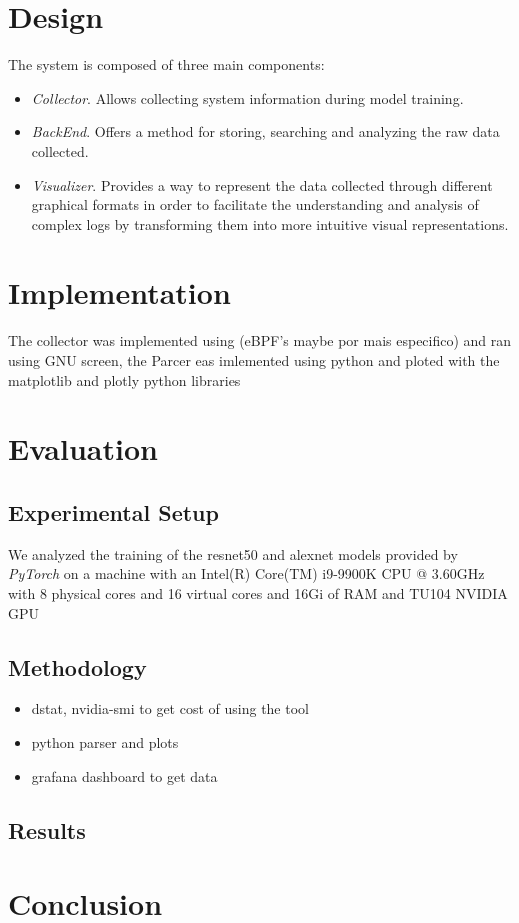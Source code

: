 \documentclass[conference]{IEEEtran}
\begin{document}
\section{Design}
    The system is composed of three main components:
    \begin{itemize}
        \item \textit{Collector}. Allows collecting system information during model training.
        \item \textit{BackEnd}. Offers a method for storing, searching and analyzing the raw data collected.
        \item \textit{Visualizer}. Provides a way to represent the data collected through different graphical formats in order to facilitate the understanding and analysis of complex logs by transforming them into more intuitive visual representations.
    \end{itemize}

\section{Implementation}
    The collector was implemented using (eBPF's maybe por mais especifico) and ran using GNU screen, the Parcer eas imlemented using python and ploted with the matplotlib and plotly python libraries 

\section{Evaluation}
\subsection{Experimental Setup}

We analyzed the training of the resnet50 \cite{resnet50} and alexnet \cite{alexnet} models
provided by \textit{PyTorch} on a machine with an Intel(R) Core(TM) i9-9900K CPU @ 3.60GHz with
8 physical cores and 16 virtual cores and 16Gi of RAM and TU104 NVIDIA GPU


\subsection{Methodology}

\begin{itemize}
    \item dstat, nvidia-smi to get cost of using the tool
    \item python parser and plots
    \item grafana dashboard to get data 
\end{itemize}

\subsection{Results}

\section{Conclusion}


\end{document}
